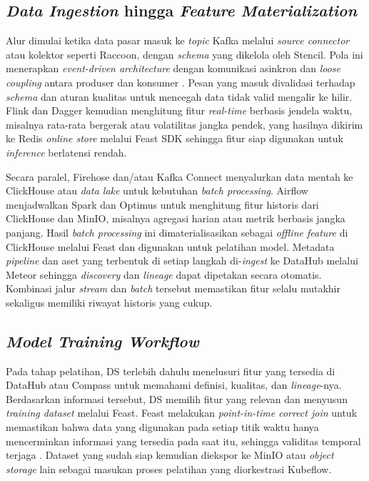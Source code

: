 \subsection{\textit{Data Ingestion} hingga \textit{Feature Materialization}}

Alur dimulai ketika data pasar masuk ke \textit{topic} Kafka melalui \textit{source connector} atau kolektor seperti Raccoon, dengan \textit{schema} yang dikelola oleh Stencil. Pola ini menerapkan \textit{event-driven architecture} dengan komunikasi asinkron dan \textit{loose coupling} antara produser dan konsumer \autocite{aws2024edapatterns,stopford2018designing}. Pesan yang masuk divalidasi terhadap \textit{schema} dan aturan kualitas untuk mencegah data tidak valid mengalir ke hilir. Flink dan Dagger kemudian menghitung fitur \textit{real-time} berbasis jendela waktu, misalnya rata-rata bergerak atau volatilitas jangka pendek, yang hasilnya dikirim ke Redis \textit{online store} melalui Feast SDK sehingga fitur siap digunakan untuk \textit{inference} berlatensi rendah.

Secara paralel, Firehose dan/atau Kafka Connect menyalurkan data mentah ke ClickHouse atau \textit{data lake} untuk kebutuhan \textit{batch processing}. Airflow menjadwalkan Spark dan Optimus untuk menghitung fitur historis dari ClickHouse dan MinIO, misalnya agregasi harian atau metrik berbasis jangka panjang. Hasil \textit{batch processing} ini dimaterialisasikan sebagai \textit{offline feature} di ClickHouse melalui Feast dan digunakan untuk pelatihan model. Metadata \textit{pipeline} dan aset yang terbentuk di setiap langkah di-\textit{ingest} ke DataHub melalui Meteor sehingga \textit{discovery} dan \textit{lineage} dapat dipetakan secara otomatis. Kombinasi jalur \textit{stream} dan \textit{batch} tersebut memastikan fitur selalu mutakhir sekaligus memiliki riwayat historis yang cukup.

\subsection{\textit{Model Training Workflow}}

Pada tahap pelatihan, DS terlebih dahulu menelusuri fitur yang tersedia di DataHub atau Compass untuk memahami definisi, kualitas, dan \textit{lineage}-nya. Berdasarkan informasi tersebut, DS memilih fitur yang relevan dan menyusun \textit{training dataset} melalui Feast. Feast melakukan \textit{point-in-time correct join} untuk memastikan bahwa data yang digunakan pada setiap titik waktu hanya mencerminkan informasi yang tersedia pada saat itu, sehingga validitas temporal terjaga \autocite{polyzotis2018data,wang2021leakage}. Dataset yang sudah siap kemudian diekspor ke MinIO atau \textit{object storage} lain sebagai masukan proses pelatihan yang diorkestrasi Kubeflow.

